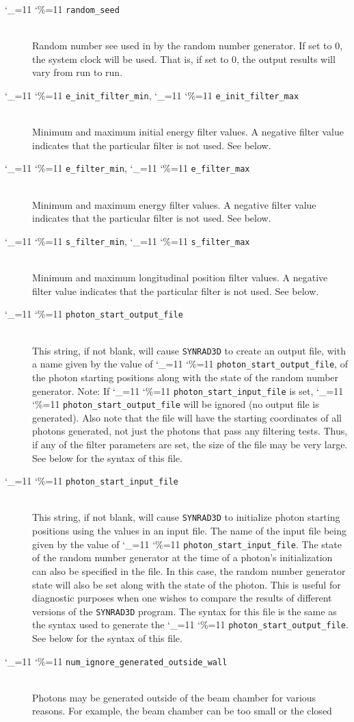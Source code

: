 \documentclass[11pt]{article}
\newcommand{\srthree}{\texttt{SYNRAD3D}\xspace}
\newcommand\ttcmd{\begingroup\catcode`\_=11 \catcode`\%=11 \dottcmd}
\newcommand\dottcmd[1]{\texttt{#1}\endgroup}
\newcommand{\vn}{\ttcmd}
\newcommand{\Newline}{\hfil \\}
\begin{document}
\begin{description}
  \item[\vn{random_seed}] \Newline
Random number see used in by the random number generator. If set to 0, the system clock
will be used. That is, if set to 0, the output results will vary from run to run. 
  \item[\vn{e_init_filter_min}, \vn{e_init_filter_max}] \Newline
Minimum and maximum initial energy filter values. A negative filter value
indicates that the particular filter is not used. See below.
  \item[\vn{e_filter_min}, \vn{e_filter_max}] \Newline
Minimum and maximum energy filter values. A negative filter value
indicates that the particular filter is not used. See below.
  \item[\vn{s_filter_min}, \vn{s_filter_max}] \Newline
Minimum and maximum longitudinal position filter values. A negative filter value
indicates that the particular filter is not used. See below.
  \item[\vn{photon_start_output_file}] \Newline
This string, if not blank, will cause \srthree to create an output
file, with a name given by the value of \vn{photon_start_output_file},
of the photon starting positions along with the state of the random
number generator. Note: If \vn{photon_start_input_file} is set,
\vn{photon_start_output_file} will be ignored (no output file is
generated). Also note that the file will have the starting coordinates
of all photons generated, not just the photons that pass any filtering
tests. Thus, if any of the filter parameters are set, the size of the
file may be very large. See below for the syntax of this file.
  \item[\vn{photon_start_input_file}] \Newline
This string, if not blank, will cause \srthree to initialize photon
starting positions using the values in an input file. The name of the
input file being given by the value of \vn{photon_start_input_file}.
The state of the random number generator at the time of a photon's
initialization can also be specified in the file. In this case, the
random number generator state will also be set along with the state of
the photon. This is useful for diagnostic purposes when one wishes to
compare the results of different versions of the \srthree program. The
syntax for this file is the same as the syntax used to generate the
\vn{photon_start_output_file}. See below for the syntax of this file.
  \item[\vn{num_ignore_generated_outside_wall}] \Newline
Photons may be generated outside of the beam chamber for various
reasons. For example, the beam chamber can be too small or the closed

\end{description}
\end{document}
